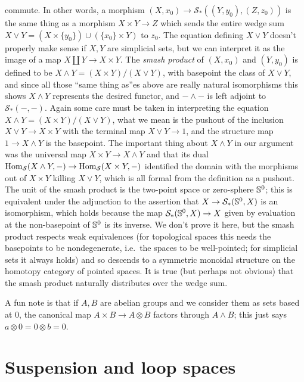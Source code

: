 commute. In other words, a morphism \((X, x_0) \to \mathcal{S}_*((Y, y_0), (Z, z_0))\) is the same thing as a morphism \(X \times Y \to Z\) which sends the entire wedge sum \(X \vee Y = (X \times \{y_0\}) \cup (\{x_0\} \times Y)\) to \(z_0\). The equation defining \(X \vee Y\) doesn't properly make sense if \(X, Y\) are simplicial sets, but we can interpret it as the image of a map \(X \coprod Y \to X \times Y\). The \emph{smash product} of \((X, x_0)\) and \((Y, y_0)\) is defined to be \(X \wedge Y = (X \times Y)/(X \vee Y)\), with basepoint the class of \(X \vee Y\), and since all those ``same thing as''es above are really natural isomorphisms this shows \(X \wedge Y\) represents the desired functor, and \(- \wedge -\) is left adjoint to \(\mathcal{S}_*(-, -)\). Again some care must be taken in interpreting the equation \(X \wedge Y = (X \times Y)/(X \vee Y)\), what we mean is the pushout of the inclusion \(X \vee Y \to X \times Y\) with the terminal map \(X \vee Y \to 1\), and the structure map \(1 \to X \wedge Y\) is the basepoint. The important thing about \(X \wedge Y\) in our argument was the universal map \(X \times Y \to X \wedge Y\) and that its dual \(\Hom_{\mathcal{S}}(X \wedge Y, -) \to \Hom_{\mathcal{S}}(X \times Y, -)\) identified the domain with the morphisms out of \(X \times Y\) killing \(X \vee Y\), which is all formal from the definition as a pushout. The unit of the smash product is the two-point space or zero-sphere \(\S^0\); this is equivalent under the adjunction to the assertion that \(X \to \mathcal{S}_*(\S^0, X)\) is an isomorphism, which holds because the map \(\mathcal{S}_*(\S^0, X) \to X\) given by evaluation at the non-basepoint of \(\S^0\) is its inverse. We don't prove it here, but the smash product respects weak equivalences (for topological spaces this needs the basepoints to be nondegenerate, i.e.~the spaces to be well-pointed; for simplicial sets it always holds) and so descends to a symmetric monoidal structure on the homotopy category of pointed spaces. It is true (but perhaps not obvious) that the smash product naturally distributes over the wedge sum.

A fun note is that if \(A, B\) are abelian groups and we consider them as sets based at \(0\), the canonical map \(A \times B \to A \otimes B\) factors through \(A \wedge B\); this just says \(a \otimes 0 = 0 \otimes b = 0\).

\section{Suspension and loop spaces}

